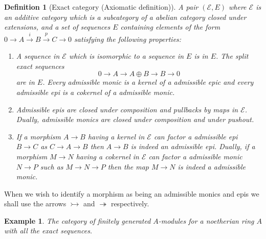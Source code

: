 \documentclass[12pt]{report}
\numberwithin{equation}{section}
\newtheorem{definition}[dummy]{Definition}
\newtheorem{example}[dummy]{Example}
\begin{document}
		
		\begin{definition}[Exact category (Axiomatic definition)]
			A pair $(\mathcal{E},E)$ where $\mathcal{E}$ is an additive category which is a subcategory of a abelian category closed under extensions, and a set of sequences $E$ containing elements of the form $0 \to A \xrightarrow{i} B \xrightarrow{p} C \to 0$ satisfying the following properties:
			\begin{enumerate}[label=(E\arabic*)]
				\item A sequence in \(\mathcal{E}\) which is isomorphic to a sequence in \(E\) is in \(E\). The split exact sequences \[0 \to A \to A \oplus B \to B \to 0\] are in \(E\). Every admissible monic is a kernel of a admissible epic and every admissible epi is a cokernel of a admissible monic.
				\item Admissible epis are closed under composition 
				and pullbacks by maps in \(\mathcal{E}\). Dually, admissible monics are closed under composition and under pushout.
				\item If a morphism \(A \to B \) having a kernel in \(\mathcal{E}\) can factor a admissible epi \(B \to C\) as \(C \to A \to B\) then \(A\to B\) is indeed an admissible epi. Dually, if a morphism \(M \to N\) having a cokernel in \(\mathcal{E}\) can factor a admissible monic \(N \to P\) such as \(M \to N \to P\) then the map \(M \to N\) is indeed a admissible monic.
			\end{enumerate}
		
		\end{definition}
		
		When we wish to identify a morphism as being an admissible monics and epis we shall use the arrows \( \rightarrowtail \) and \( \twoheadrightarrow \) respectively.
		
	
		
		
		\begin{example}The category of finitely generated \(A\)-modules for a noetherian ring \(A\) with all the exact sequences.
		\end{example}
	
\end{document}
